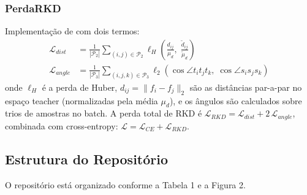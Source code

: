 \documentclass[
  article,            %
  11pt,               %
  letterpaper,        %
  oneside,            %
  sumario = tradicional
]{abntex2}
\begin{document}
\subsubsection{PerdaRKD}
Implementação de \textcite{park2019rkd} com dois termos:
\\
\begin{align}
  \mathcal{L}_{dist} &= \frac{1}{|\mathcal{P}_2|}
    \sum_{(i,j) \in \mathcal{P}_2}
    \ell_H\!\left(\frac{d_{ij}}{\mu_d},\; \frac{\tilde{d}_{ij}}{\tilde{\mu}_d}\right)
  \label{eq:rkd_dist} \\
  \mathcal{L}_{angle} &= \frac{1}{|\mathcal{P}_3|}
    \sum_{(i,j,k) \in \mathcal{P}_3}
    \ell_2\!\left(\cos\angle t_i t_j t_k,\; \cos\angle s_i s_j s_k\right)
  \label{eq:rkd_angle}
\end{align}
onde $\ell_H$ é a perda de Huber, $d_{ij} = \|f_i - f_j\|_2$ são as
distâncias par-a-par no espaço teacher (normalizadas pela média $\mu_d$),
e os ângulos são calculados sobre trios de amostras no batch.
A perda total de RKD é $\mathcal{L}_{RKD} = \mathcal{L}_{dist} + 2\,\mathcal{L}_{angle}$,
combinada com cross-entropy: $\mathcal{L} = \mathcal{L}_{CE} + \mathcal{L}_{RKD}$.

\subsection{Estrutura do Repositório}
\label{sec:repo}

O repositório está organizado conforme a Tabela 1 e a
Figura 2.
\end{document}
